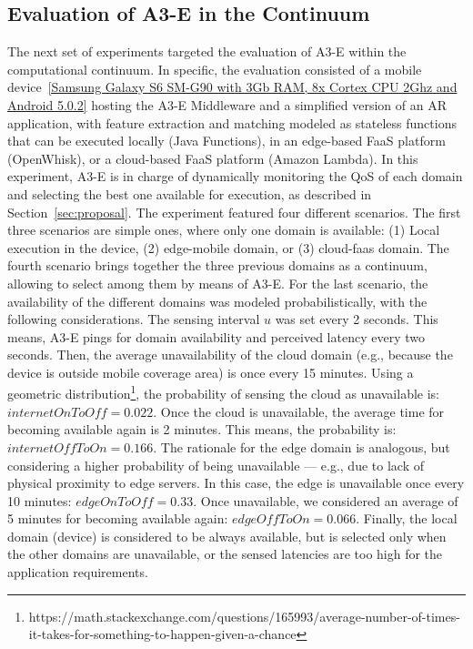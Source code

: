 
\subsection{Evaluation of A3-E in the Continuum} The next set of experiments targeted the evaluation of A3-E within the computational continuum. In specific, the evaluation consisted of a mobile device~\ref{Samsung Galaxy S6 SM-G90 with 3Gb RAM, 8x Cortex CPU 2Ghz and Android 5.0.2} hosting the A3-E Middleware and a simplified version of an AR application, with feature extraction and matching modeled as stateless functions that can be executed locally (Java Functions), in an edge-based FaaS platform (OpenWhisk), or a cloud-based FaaS platform (Amazon Lambda). In this experiment, A3-E is in charge of dynamically monitoring the QoS of each domain and selecting the best one available for execution, as described in Section~\ref{sec:proposal}.
The experiment featured four different scenarios. The first three scenarios are simple ones, where only one domain is available: (1) Local execution in the device, (2) edge-mobile domain, or (3) cloud-faas domain. The fourth scenario brings together the three previous domains as a continuum, allowing to select among them by means of A3-E. 
For the last scenario, the availability of the different domains was modeled probabilistically, with the following considerations. The sensing interval $u$ was set every 2 seconds. This means, A3-E pings for domain availability and perceived latency every two seconds. Then, the average unavailability of the cloud domain (e.g., because the device is outside mobile coverage area) is once every 15 minutes. Using a geometric distribution\footnote{https://math.stackexchange.com/questions/165993/average-number-of-times-it-takes-for-something-to-happen-given-a-chance}, the probability of sensing the cloud as unavailable is: $internetOnToOff=0.022$. Once the cloud is unavailable, the average time for becoming available again is 2 minutes. This means, the probability is: $internetOffToOn=0.166$. The rationale for the edge domain is analogous, but considering a higher probability of being unavailable --- e.g., due to lack of physical proximity to edge servers. In this case, the edge is unavailable once every 10 minutes: $edgeOnToOff = 0.33$. Once unavailable, we considered an average of 5 minutes for becoming available again: $edgeOffToOn=0.066$. Finally, the local domain (device) is considered to be always available, but is selected only when the other domains are unavailable, or the sensed latencies are too high for the application requirements.


